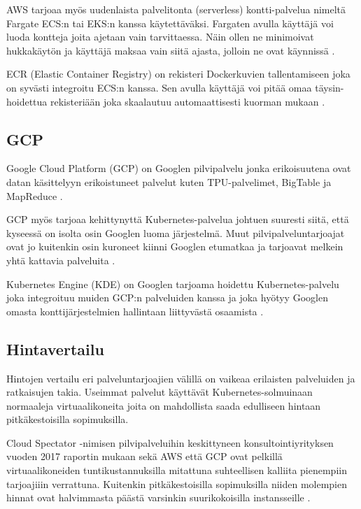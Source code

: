 \documentclass[finnish,gradu]{tktltiki3}
\begin{document}
    AWS tarjoaa myös uudenlaista palvelitonta (serverless) kontti-palvelua nimeltä Fargate ECS:n tai EKS:n kanssa käytettäväksi. Fargaten avulla käyttäjä voi luoda kontteja joita ajetaan vain tarvittaessa. Näin ollen ne minimoivat hukkakäytön ja käyttäjä maksaa vain siitä ajasta, jolloin ne ovat käynnissä \cite{aws-docs-fargate}.
    
    ECR (Elastic Container Registry) on rekisteri Dockerkuvien tallentamiseen joka on syvästi integroitu ECS:n kanssa. Sen avulla käyttäjä voi pitää omaa täysin-hoidettua rekisteriään joka skaalautuu automaattisesti kuorman mukaan \cite{aws-docs-ecr}.
    
    \subsection{GCP}
    \label{sb:gcp}
    
    Google Cloud Platform (GCP) on Googlen pilvipalvelu jonka erikoisuutena ovat datan käsittelyyn erikoistuneet palvelut kuten TPU-palvelimet, BigTable ja MapReduce \cite{gcp-advantages}.
    
    GCP myös tarjoaa kehittynyttä Kubernetes-palvelua johtuen suuresti siitä, että kyseessä on isolta osin Googlen luoma järjestelmä. Muut pilvipalveluntarjoajat ovat jo kuitenkin osin kuroneet kiinni Googlen etumatkaa ja tarjoavat melkein yhtä kattavia palveluita \cite{kubernetes-competition}.
    
    Kubernetes Engine (KDE) on Googlen tarjoama hoidettu Kubernetes-palvelu joka integroituu muiden GCP:n palveluiden kanssa ja joka hyötyy Googlen omasta konttijärjestelmien hallintaan liittyvästä osaamista \cite{kde-docs}.
    
    \subsection{Hintavertailu}
    
    Hintojen vertailu eri palveluntarjoajien välillä on vaikeaa erilaisten palveluiden ja ratkaisujen takia. Useimmat palvelut käyttävät Kubernetes-solmuinaan normaaleja virtuaalikoneita joita on mahdollista saada edulliseen hintaan pitkäkestoisilla sopimuksilla.
    
    Cloud Spectator -nimisen pilvipalveluihin keskittyneen konsultointiyrityksen vuoden 2017 raportin mukaan sekä AWS että GCP ovat pelkillä virtuaalikoneiden tuntikustannuksilla mitattuna suhteellisen kalliita pienempiin tarjoajiiin verrattuna. Kuitenkin pitkäkestoisilla sopimuksilla niiden molempien hinnat ovat halvimmasta päästä varsinkin suurikokoisilla instansseille \cite{cloud-price-comparison}.
    
\end{document}
